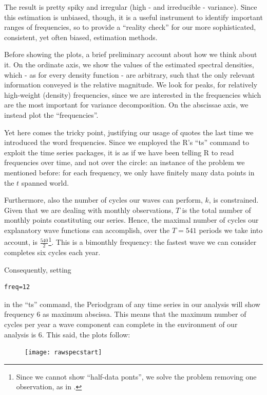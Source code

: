 \documentclass[12pt]{article} %
\begin{document}
The result is pretty spiky and irregular (high - and irreducible - variance). Since this estimation is unbiased, though, it is a useful instrument to identify important ranges of frequencies, so to provide a ``reality check'' for our more sophisticated, consistent, yet often biased, estimation methods. 

Before showing the plots, a brief preliminary account about how we think about it. On the ordinate axis, we show the values of the estimated spectral densities, which - as for every density function - are arbitrary, such that the only relevant information conveyed is the relative magnitude. We look for peaks, for relatively high-weight (density) frequencies, since we are interested in the frequencies which are the most important for variance decomposition. On the abscissae axis, we instead plot the ``frequencies''. 

Yet here comes the tricky point, justifying our usage of quotes the last time we introduced the word frequencies. Since we employed the R's ``ts'' command to exploit the time series packages, it is as if we have been telling R to read frequencies over time, and not over the circle: an instance of the problem we mentioned before: for each frequency, we only have finitely many data points in the ${t}$ spanned world. 

Furthermore, also the number of cycles our waves can perform, $k$,  is constrained. Given that we are dealing with monthly observations, $T$ is the total number of monthly points constituting our series. Hence, the maximal number of cycles our explanatory wave functions can accomplish, over the $T=541$ periods we take into account, is $\frac{540}{2}$\footnote{Since we cannot show ``half-data ponts'', we solve the problem removing one observation, as in \citet{hammy}.}. This is a bimonthly frequency: the fastest wave we can consider completes six cycles each year. 

Consequently, setting 
\begin{verbatim}
freq=12
\end{verbatim} 
in the ``ts'' command, the Periodgram of any time series in our analysis will show frequency 6 as maximum abscissa. This means that the maximum number of cycles per year a wave component can complete in the environment of our analysis is 6.
This said, the plots follow:

\begin{figure}[H]
\begin{center}
\texttt{[image: rawspecstart]}
\caption{}
\end{center}
\end{figure}
\end{document}
